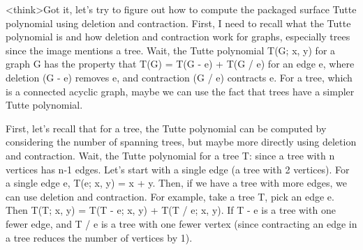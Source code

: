 <think>Got it, let's try to figure out how to compute the packaged surface Tutte polynomial using deletion and contraction. First, I need to recall what the Tutte polynomial is and how deletion and contraction work for graphs, especially trees since the image mentions a tree. Wait, the Tutte polynomial T(G; x, y) for a graph G has the property that T(G) = T(G - e) + T(G / e) for an edge e, where deletion (G - e) removes e, and contraction (G / e) contracts e. For a tree, which is a connected acyclic graph, maybe we can use the fact that trees have a simpler Tutte polynomial.

First, let's recall that for a tree, the Tutte polynomial can be computed by considering the number of spanning trees, but maybe more directly using deletion and contraction. Wait, the Tutte polynomial for a tree T: since a tree with n vertices has n-1 edges. Let's start with a single edge (a tree with 2 vertices). For a single edge e, T(e; x, y) = x + y. Then, if we have a tree with more edges, we can use deletion and contraction. For example, take a tree T, pick an edge e. Then T(T; x, y) = T(T - e; x, y) + T(T / e; x, y). If T - e is a tree with one fewer edge, and T / e is a tree with one fewer vertex (since contracting an edge in a tree reduces the number of vertices by 1). 

